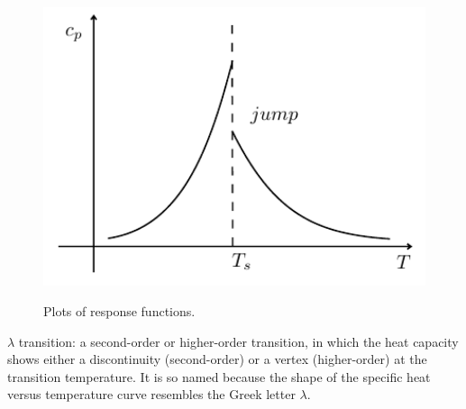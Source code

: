 \documentclass[../main/main.tex]{subfiles}
\begin{document}
\begin{figure}[h!]
\begin{minipage}[c]{0.5\linewidth}
{\includegraphics[width=1\textwidth]{../lessons/3_image/8.pdf}

    \label{fig:3_04_3} }
\end{minipage}
\begin{minipage}[]{0.5\linewidth}
\centering
{}
\end{minipage}
\caption{\label{fig:} Plots of response functions.}
\end{figure}

\begin{remark}
\( \lambda  \) transition: a second-order or higher-order transition, in which the heat capacity shows either a discontinuity (second-order) or a vertex (higher-order) at the transition temperature.  It is so named because the shape of the specific heat versus temperature curve resembles the Greek letter \( \lambda  \).
\end{remark}
\end{document}
